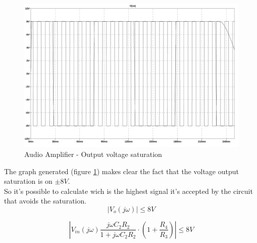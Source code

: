 \documentclass[10pt,a4paper]{article}
\begin{document}
\begin{figure}[H]
  \centering
  \includegraphics[width=14cm]{graph/1d4.jpg}
  \caption{Audio Amplifier - Output voltage saturation}
  \label{1d4graph}
\end{figure}
The graph generated (figure \ref{1d4graph}) makes clear the fact that the voltage output saturation is on $\pm8V$.\\
So it's possible to calculate wich is the highest signal it's accepted by the circuit that avoids the saturation.\\

\begin{equation}
|V_o(j\omega )| \leq 8V
\end{equation}

\begin{equation}
\left|V_{in}(j\omega )\frac{j\omega C_2R_2}{1+j\omega C_2R_2} \cdot \left(1 + \frac{R_4}{R_3} \right) \right| \leq 8V
\end{equation}
\end{document}
